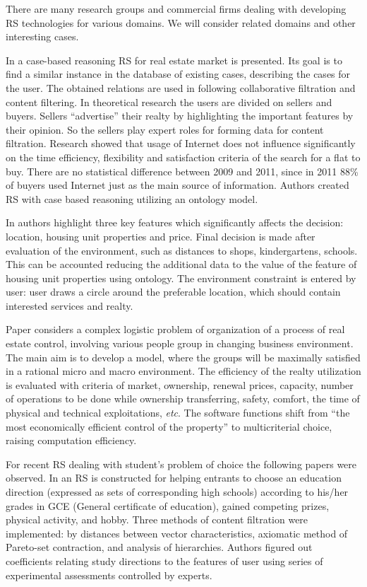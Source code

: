 \documentclass[conference]{IEEEtran}
\begin{document}
There are many research groups and commercial firms dealing with developing RS technologies for various domains.  We will consider related domains and other interesting cases.

In \cite{br22} a case-based reasoning RS for real estate market is presented.  Its goal is to find a similar instance in the database of existing cases, describing the cases for the user.  The obtained relations are used in following collaborative filtration and content filtering.  In theoretical research \cite{br20} the users are divided on sellers and buyers.  Sellers ``advertise'' their realty by highlighting the important features by their opinion.  So the sellers play expert roles for forming data for content filtration.  Research \cite{br23} showed that usage of Internet does not influence significantly on the time efficiency, flexibility and satisfaction criteria of the search for a flat to buy.  There are no statistical difference between 2009 and 2011, since in 2011 88\% of buyers used Internet just as the main source of information.  Authors created RS with case based reasoning utilizing an ontology model.

In \cite{br23} authors highlight three key features which significantly affects the decision: location, housing unit properties and price.  Final decision is made after evaluation of the environment, such as distances to shops, kindergartens, schools.  This can be accounted reducing the additional data to the value of the feature of housing unit properties using ontology.  The environment constraint is entered by user: user draws a circle around the preferable location, which should contain interested services and realty.

Paper \cite{br21} considers a complex logistic problem of organization of a process of real estate control, involving various people group in changing business environment.  The main aim is to develop a model, where the groups will be maximally satisfied in a rational micro and macro environment.  The efficiency of the realty utilization is evaluated with criteria of market, ownership, renewal prices, capacity, number of operations to be done while ownership transferring, safety, comfort, the time of physical and technical exploitations, \emph{etc}.  The software functions shift from ``the most economically efficient control of the property'' to multicriterial choice, raising computation efficiency.


For recent RS dealing with student's problem of choice the following papers were observed. In \cite{belotsky} an RS is constructed for helping entrants to choose an education direction (expressed as sets of corresponding high schools) according to his/her grades in GCE (General certificate of education), gained competing prizes, physical activity, and hobby.  Three methods of content filtration were implemented: by distances between vector characteristics, axiomatic method of Pareto-set contraction, and analysis of hierarchies.  Authors figured out coefficients relating study directions to the features of user using series of experimental assessments controlled by experts.
\end{document}
